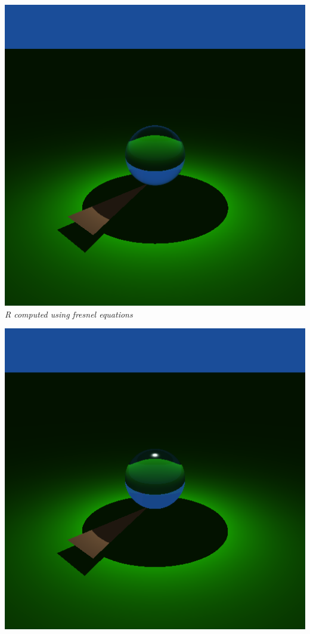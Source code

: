 \documentclass[a4,12pt]{article}
\begin{document}
	\begin{center}
		\begin{minipage}[b]{0.40\linewidth}
			\begin{center}
				\includegraphics[width = \textwidth]{./Worksheet8/transparent_fresnel.png}\\
				\textit{R computed using fresnel equations}\\
			\end{center}
		\end{minipage}
		\hspace{0.05\linewidth}
		\begin{minipage}[b]{0.40\linewidth}
			\begin{center}
				\includegraphics[width = \textwidth]{./Worksheet8/r01.png}\\

\end{center}
\end{minipage}
\end{center}
\end{document}
